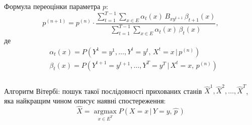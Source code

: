 \documentclass[12pt,mathserif]{beamer}
\DeclareMathOperator*{\argmax}{argmax}
\theoremstyle{plain}
\begin{document}
\begin{frame}
    \frametitle{\insertsection}

    Формула переоцінки параметра $p:$
    \begin{equation*}
        p^{(n+1)} = p^{(n)}\cdot\frac{\sum\limits_{t=1}^{T-1}\sum\limits_{x \in E} \alpha_t(x)\,B_{xy^{t+1}}\,\beta_{t+1}(x)}{\sum\limits_{t=1}^{T-1}\sum\limits_{x \in E} \alpha_t(x)\,\beta_t(x)},
    \end{equation*}
    де 
    \begin{align*}
        & \alpha_t(x) = P\left( Y^1=y^1,\ldots,Y^t=y^t,\,X^t=x \,|\, p^{(n)} \right) \\
        & \beta_t(x) = P\left( Y^{t+1}=y^{t+1},\ldots,Y^T=y^T \,|\, X^t=x,\, p^{(n)} \right)
    \end{align*}
\end{frame}

\begin{frame}
    \frametitle{\insertsection}

    Алгоритм Вітербі: пошук такої послідовності прихованих станів $\widehat{X}^1,\widehat{X}^2,\ldots,\widehat{X}^T$, яка найкращим чином описує наявні спостереження:
    \begin{equation*}
        \widehat{X} = \argmax\limits_{x \in E^T} P\left( X=x\,|\,Y=y,\widehat{\,p\,} \right)
    \end{equation*}
\end{frame} 
\end{document}
